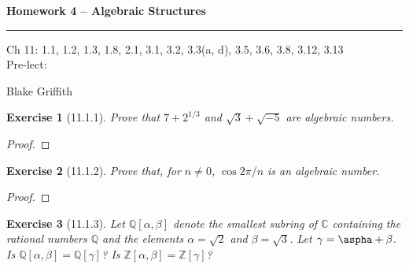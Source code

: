 \documentclass[12pt]{article}
\newtheorem*{exer}{Exercise}
\begin{document}
\textbf{Homework 4 -- Algebraic Structures} \\

\hrule

\begin{minipage}{.80\linewidth}
    \flushleft
    Ch 11: 1.1, 1.2, 1.3, 1.8, 2.1, 3.1, 3.2, 3.3(a, d), 3.5, 3.6, 3.8,
    3.12, 3.13 \\
    Pre-lect:  \\
\end{minipage}
\begin{minipage}{.20\linewidth}
    \flushright
    Blake Griffith
\end{minipage}


\begin{exer}[11.1.1]

    Prove that $7 + 2^{1/3}$ and $\sqrt{3} + \sqrt{-5}$ are algebraic
    numbers.

\end{exer}

\begin{proof}
\end{proof}


\begin{exer}[11.1.2]

    Prove that, for $n \neq 0$, $\cos{2\pi / n}$ is an algebraic number.

\end{exer}

\begin{proof}
\end{proof}


\begin{exer}[11.1.3]

    Let $\mathbb{Q}[\alpha, \beta]$ denote the smallest subring of
    $\mathbb{C}$ containing the rational numbers $\mathbb{Q}$ and the
    elements $\alpha = \sqrt{2}$ and $\beta = \sqrt{3}$. Let $\gamma =
    \aspha + \beta$. Is $\mathbb{Q}[\alpha, \beta] =
    \mathbb{Q}[\gamma]$? Is $\mathbb{Z}[\alpha, \beta] =
    \mathbb{Z}[\gamma]$?

\end{exer}
\end{document}
